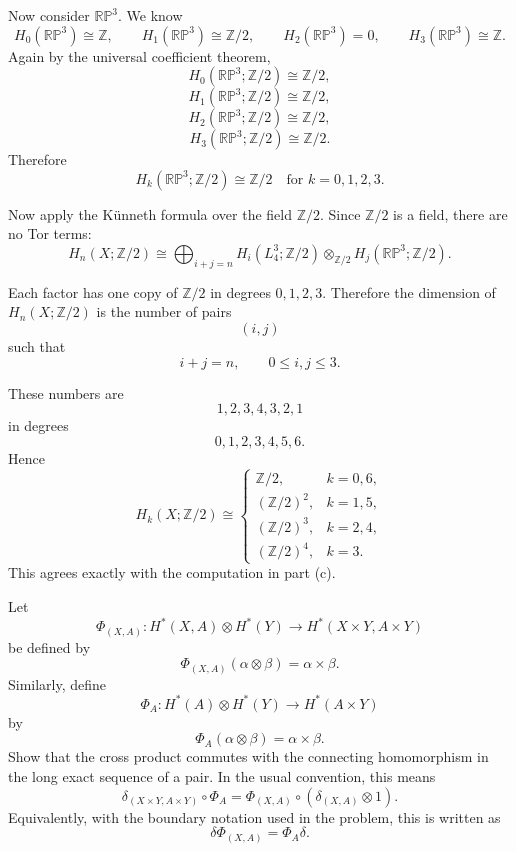 \begin{solution}
Now consider \(\mathbb{RP}^3\). We know
\[
H_0(\mathbb{RP}^3)\cong \mathbb Z,
\qquad
H_1(\mathbb{RP}^3)\cong \mathbb Z/2,
\qquad
H_2(\mathbb{RP}^3)=0,
\qquad
H_3(\mathbb{RP}^3)\cong \mathbb Z.
\]
Again by the universal coefficient theorem,
\[
H_0(\mathbb{RP}^3;\mathbb Z/2)\cong \mathbb Z/2,
\]
\[
H_1(\mathbb{RP}^3;\mathbb Z/2)\cong \mathbb Z/2,
\]
\[
H_2(\mathbb{RP}^3;\mathbb Z/2)\cong \mathbb Z/2,
\]
\[
H_3(\mathbb{RP}^3;\mathbb Z/2)\cong \mathbb Z/2.
\]
Therefore
\[
\boxed{
	H_k(\mathbb{RP}^3;\mathbb Z/2)\cong \mathbb Z/2
	\quad\text{for }k=0,1,2,3.}
\]

Now apply the Künneth formula over the field \(\mathbb Z/2\). Since \(\mathbb Z/2\) is a field, there are no Tor terms:
\[
H_n(X;\mathbb Z/2)
\cong
\bigoplus_{i+j=n}
H_i(L_4^3;\mathbb Z/2)
\otimes_{\mathbb Z/2}
H_j(\mathbb{RP}^3;\mathbb Z/2).
\]

Each factor has one copy of \(\mathbb Z/2\) in degrees \(0,1,2,3\). Therefore the dimension of \(H_n(X;\mathbb Z/2)\) is the number of pairs
\[
(i,j)
\]
such that
\[
i+j=n,
\qquad
0\leq i,j\leq 3.
\]

These numbers are
\[
1,2,3,4,3,2,1
\]
in degrees
\[
0,1,2,3,4,5,6.
\]
Hence
\[
\boxed{
	H_k(X;\mathbb Z/2)\cong
	\begin{cases}
		\mathbb Z/2, & k=0,6,\\[1mm]
		(\mathbb Z/2)^2, & k=1,5,\\[1mm]
		(\mathbb Z/2)^3, & k=2,4,\\[1mm]
		(\mathbb Z/2)^4, & k=3.
\end{cases}}
\]
This agrees exactly with the computation in part (c).
\end{solution}

\begin{problem}
Let
\[
\Phi_{(X,A)}:
H^*(X,A)\otimes H^*(Y)
\longrightarrow
H^*(X\times Y,A\times Y)
\]
be defined by
\[
\Phi_{(X,A)}(\alpha\otimes \beta)=\alpha\times \beta.
\]
Similarly, define
\[
\Phi_A:
H^*(A)\otimes H^*(Y)
\longrightarrow
H^*(A\times Y)
\]
by
\[
\Phi_A(\alpha\otimes \beta)=\alpha\times \beta.
\]
Show that the cross product commutes with the connecting homomorphism in the long exact sequence of a pair. In the usual convention, this means
\[
\delta_{(X\times Y,A\times Y)}\circ \Phi_A
=
\Phi_{(X,A)}\circ(\delta_{(X,A)}\otimes 1).
\]
Equivalently, with the boundary notation used in the problem, this is written as
\[
\delta\Phi_{(X,A)}=\Phi_A\delta .
\]
\end{problem}

